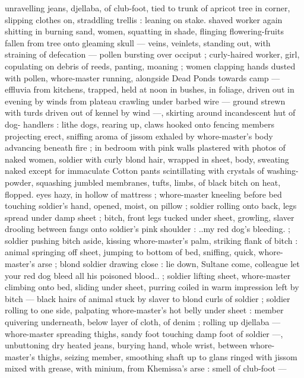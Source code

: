 unravelling jeans, djellaba, of club-foot, tied to trunk of apricot tree 
in corner, slipping clothes on, straddling trellis : leaning on stake. 
shaved worker again shitting in burning sand, women, squatting in 
shade, flinging flowering-fruits fallen from tree onto gleaming skull 
--- veins, veinlets, standing out, with straining of defecation --- 
pollen bursting over occiput ; curly-haired worker, girl, copulating on 
debris of reeds, panting, moaning ; women clapping hands dusted 
with pollen, whore-master running, alongside {\gl} Dead Ponds {\gr} 
towards camp --- effluvia from kitchens, trapped, held at noon in 
bushes, in foliage, driven out in evening by winds from plateau 
crawling under barbed wire --- ground strewn with turds driven out 
of kennel by wind ---, skirting around incandescent hut of dog- 
handlers : lithe dogs, rearing up, claws hooked onto fencing 
members projecting erect, sniffing aroma of jissom exhaled by 
whore-master's body advancing beneath fire ; in bedroom with pink 
walls plastered with photos of naked women, soldier with curly blond 
hair, wrapped in sheet, body, sweating naked except for immaculate 
Cotton pants scintillating with crystals of washing-powder, squashing 
jumbled membranes, tufts, limbs, of black bitch on heat, flopped. 
eyes hazy, in hollow of mattress ; whore-master kneeling before bed 
touching soldier's hand, opened, moist, on pillow ; soldier rolling 
onto back, legs spread under damp sheet ; bitch, front legs tucked 
under sheet, growling, slaver drooling between fangs onto soldier's 
pink shoulder : {\td} {\gl}..my red dog's bleeding.{\gr} ; soldier pushing bitch 
aside, kissing whore-master's palm, striking flank of bitch : animal 
springing off sheet, jumping to bottom of bed, sniffing, quick, 
whore-master's arse ; blond soldier drawing close : {\td} {\gl} {\td} lie down, 
Sultane{\thd} come, colleague{\thd} let your red dog bleed all his poisoned 
blood..{\gr} ; soldier lifting sheet, whore-master climbing onto bed, 
sliding under sheet, purring coiled in warm impression left by bitch 
--- black hairs of animal stuck by slaver to blond curls of soldier ; 
soldier rolling to one side, palpating whore-master's hot belly under 
sheet : member quivering underneath, below layer of cloth, of denim 
; rolling up djellaba --- whore-master spreading thighs, sandy foot 
touching damp foot of soldier ---, unbuttoning dry heated jeans, 
burying hand, whole wrist, between whore-master's thighs, seizing 
member, smoothing shaft up to glans ringed with jissom mixed with 
grease, with minium, from Khemissa's arse : smell of club-foot --- 
